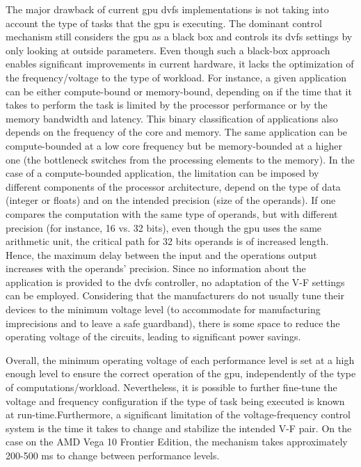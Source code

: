 The major drawback of current \acrshort{gpu} \acrshort{dvfs} implementations is not taking into account the type of tasks that the \acrshort{gpu} is executing. The dominant control mechanism still considers the \acrshort{gpu} as a black box and controls its \acrshort{dvfs} settings by only looking at outside parameters. Even though such a black-box approach enables significant improvements in current hardware, it lacks the optimization of the frequency/voltage to the type of workload. For instance, a given application can be either compute-bound or memory-bound, depending on if the time that it takes to perform the task is limited by the processor performance or by the memory bandwidth and latency. This binary classification of applications also depends on the frequency of the core and memory. The same application can be compute-bounded at a low core frequency but be memory-bounded at a higher one \cite{guerreiro_dvfs-aware_2019} (the bottleneck switches from the processing elements to the memory). In the case of a compute-bounded application, the limitation can be imposed by different components of the processor architecture, depend on the type of data (integer or floats) and on the intended precision (size of the operands). If one compares the computation with the same type of operands, but with different precision (for instance, 16 vs. 32 bits), even though the \acrshort{gpu} uses the same arithmetic unit, the critical path for 32 bits operands is of increased length. Hence, the maximum delay between the input and the operations output increases with the operands' precision. 
Since no information about the application is provided to the \acrshort{dvfs} controller, no adaptation of the V-F settings can be employed.
Considering that the manufacturers do not usually tune their devices to the minimum voltage level (to accommodate for manufacturing imprecisions and to leave a safe guardband), there is some space to reduce the operating voltage of the circuits, leading to significant power savings. 

Overall, the minimum operating voltage of each performance level is set at a high enough level to ensure the correct operation of the \acrshort{gpu}, independently of the type of computations/workload. Nevertheless, it is possible to further fine-tune the voltage and frequency configuration if the type of task being executed is known at run-time.Furthermore, a significant limitation of the voltage-frequency control system is the time it takes to change and stabilize the intended V-F pair. On the case on the AMD Vega 10 Frontier Edition, the mechanism takes approximately 200-500 ms to change between performance levels.

